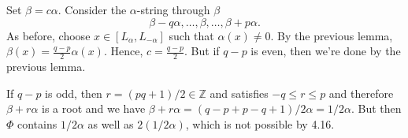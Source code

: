 Set $\beta = c\alpha$. Consider the $\alpha$-string through $\beta$
\[ \beta - q\alpha, \ldots, \beta, \ldots, \beta + p\alpha. \]
As before, choose $x \in [L_\alpha, L_{-\alpha}]$ such that
$\alpha(x)\neq 0$. By the previous lemma,
$\beta(x) = \frac{q-p}{2}\alpha(x)$. Hence, $c = \frac{q-p}{2}$.
But if $q - p$ is even, then we're done by the previous lemma.

If $q - p$ is odd, then $r = (pq+1)/2 \in \mathbb{Z}$ and satisfies
$-q\leq r\leq p$ and therefore $\beta + r\alpha$ is a root and we have
$\beta+r\alpha = (q-p+p-q+1)/2 \alpha = 1/2 \alpha$. But then
$\Phi$ contains $1/2 \alpha$ as well as $2(1/2 \alpha)$, which is not possible
by 4.16.
